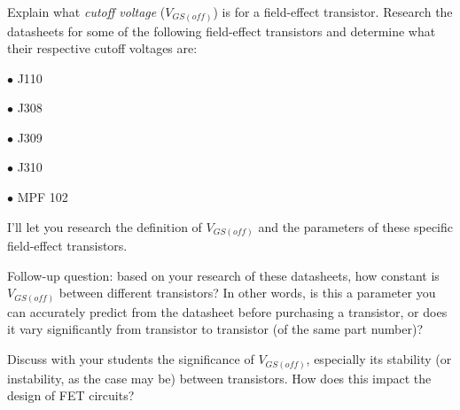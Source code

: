 

Explain what {\it cutoff voltage} ($V_{GS(off)}$) is for a field-effect transistor.  Research the datasheets for some of the following field-effect transistors and determine what their respective cutoff voltages are:

\medskip
\goodbreak
\item{$\bullet$} J110
\item{$\bullet$} J308
\item{$\bullet$} J309
\item{$\bullet$} J310
\item{$\bullet$} MPF 102 
\medskip







I'll let you research the definition of $V_{GS(off)}$ and the parameters of these specific field-effect transistors.

\vskip 10pt

Follow-up question: based on your research of these datasheets, how constant is $V_{GS(off)}$ between different transistors?  In other words, is this a parameter you can accurately predict from the datasheet before purchasing a transistor, or does it vary significantly from transistor to transistor (of the same part number)?







Discuss with your students the significance of $V_{GS(off)}$, especially its stability (or instability, as the case may be) between transistors.  How does this impact the design of FET circuits?




